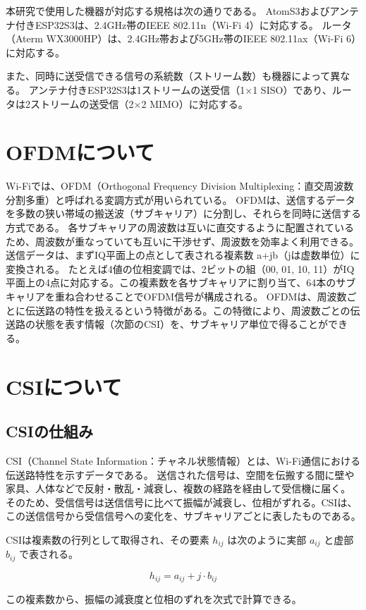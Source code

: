 \documentclass[uplatex, 12pt]{ujbook}
\begin{document}
本研究で使用した機器が対応する規格は次の通りである。
AtomS3およびアンテナ付きESP32S3は、2.4GHz帯のIEEE 802.11n（Wi-Fi 4）に対応する。
ルータ（Aterm WX3000HP）は、2.4GHz帯および5GHz帯のIEEE 802.11ax（Wi-Fi 6）に対応する。

また、同時に送受信できる信号の系統数（ストリーム数）も機器によって異なる。
アンテナ付きESP32S3は1ストリームの送受信（1×1 SISO）であり、ルータは2ストリームの送受信（2×2 MIMO）に対応する。
\section{OFDMについて}
Wi-Fiでは、OFDM（Orthogonal Frequency Division Multiplexing：直交周波数分割多重）と呼ばれる変調方式が用いられている。
OFDMは、送信するデータを多数の狭い帯域の搬送波（サブキャリア）に分割し、それらを同時に送信する方式である。
各サブキャリアの周波数は互いに直交するように配置されているため、周波数が重なっていても互いに干渉せず、周波数を効率よく利用できる。
送信データは、まずIQ平面上の点として表される複素数 a+jb（jは虚数単位）に変換される。
たとえば4値の位相変調では、2ビットの組（00, 01, 10, 11）がIQ平面上の4点に対応する。この複素数を各サブキャリアに割り当て、64本のサブキャリアを重ね合わせることでOFDM信号が構成される。
OFDMは、周波数ごとに伝送路の特性を扱えるという特徴がある。この特徴により、周波数ごとの伝送路の状態を表す情報（次節のCSI）を、サブキャリア単位で得ることができる。
\section{CSIについて}
\subsection{CSIの仕組み}
CSI（Channel State Information：チャネル状態情報）とは、Wi-Fi通信における伝送路特性を示すデータである。
送信された信号は、空間を伝搬する間に壁や家具、人体などで反射・散乱・減衰し、複数の経路を経由して受信機に届く。
そのため、受信信号は送信信号に比べて振幅が減衰し、位相がずれる。CSIは、この送信信号から受信信号への変化を、サブキャリアごとに表したものである。

CSIは複素数の行列として取得され、その要素 $h_{ij}$ は次のように実部 $a_{ij}$ と虚部 $b_{ij}$ で表される。

\begin{equation}
h_{ij} = a_{ij} + j·b_{ij}
\end{equation}

この複素数から、振幅の減衰度と位相のずれを次式で計算できる。
\end{document}
